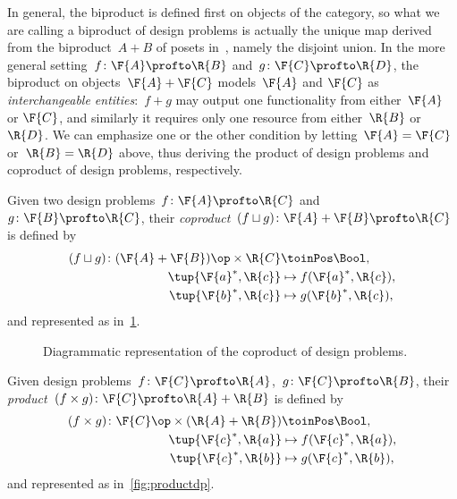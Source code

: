 In general, the biproduct is defined first on objects of the category, so what we are calling a biproduct of design problems is actually the unique map derived from the biproduct~$A + B$ of posets in~\DP, namely the disjoint union. In the more general setting~$f\colon \F{A} \profto \R{B}$ and~$g \colon \F{C} \profto \R{D}$, the biproduct on objects~$\F{A} + \F{C}$ models~$\F{A}$ and $\F{C}$ as \emph{interchangeable entities}:~$f+g$ may output one functionality from either~$\F{A}$ or $\F{C}$, and similarly it requires only one resource from either~$\R{B}$ or~$\R{D}$. We can emphasize one or the other condition by letting~$\F{A} = \F{C}$ or~$\R{B} =\R{D}$ above, thus deriving the product of design problems and coproduct of design problems, respectively.


\begin{definition}
  \label{define:coproduct}
  Given two design problems~$f\colon \F{A} \profto \R{C}$ and~$g \colon \F{B} \profto \R{C}$, their \emph{coproduct}~$(f \sqcup g)\colon \F{A} + \F{B} \profto \R{C}$ is defined by
  \begin{equation}
    \begin{aligned}
      (f \sqcup g) \colon (\F{A} + \F{B})\op \times \R{C} & \toinPos \Bool,  \\
      \tup{ \F{a}^*, \R{c}} & \mapsto f(\F{a}^*, \R{c}), \\
      \tup{ \F{b}^*, \R{c}} & \mapsto g(\F{b}^*, \R{c}),
    \end{aligned}
  \end{equation}
  and represented as in~\cref{fig:coproductdp}.
\end{definition}

\begin{figure}[h!]
  \begin{center}
  \end{center}
  \caption{Diagrammatic representation of the coproduct of design problems. \label{fig:coproductdp}}
\end{figure}

\begin{definition}
  \label{define:product}
  Given design problems~$f\colon \F{C} \profto \R{A}$,~$g \colon \F{C} \profto \R{B}$, their \emph{product}~$(f \times g)\colon \F{C} \profto \R{A} + \R{B}$ is defined by
  \begin{equation}
    \begin{aligned}
      (f \times g) \colon \F{C}\op  \times (\R{A} + \R{B}) & \toinPos \Bool,  \\
      \tup{\F{c}^*, \R{a}} & \mapsto f(\F{c}^*, \R{a}), \\
      \tup{\F{c}^*, \R{b}} & \mapsto g(\F{c}^*, \R{b}),
    \end{aligned}
  \end{equation}
  and represented as in~\cref{fig:productdp}.
\end{definition}

